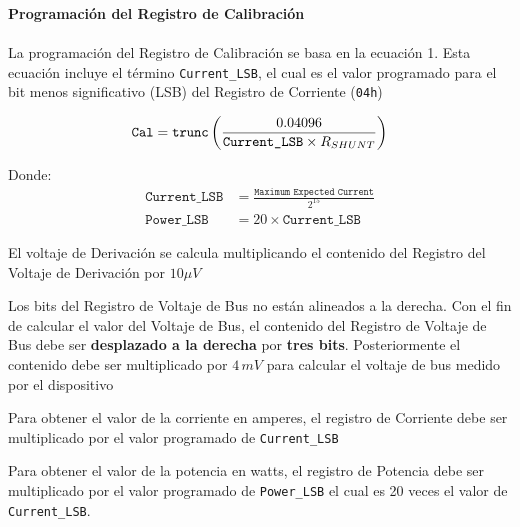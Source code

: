 \documentclass[12pt,a4paper]{article}
\begin{document}
	\noindent \textbf{Programación del Registro de Calibración}\\\\
	La programación del Registro de Calibración se basa en la ecuación 1. Esta ecuación incluye el término \texttt{Current\_LSB}, el cual es el valor programado para el bit menos significativo (LSB) del Registro de Corriente (\texttt{04h})
	
	\begin{tcolorbox}[colback=red!5!white,colframe=red!75!black,width=(\linewidth+0.45cm)]
		\begin{equation}
				\verb|Cal| = \verb|trunc|\left( \frac{0.04096}{\texttt{Current\_LSB}\times R_{SHUNT}} \right)
		\end{equation}
	\end{tcolorbox}

	Donde:
	\begin{align}
		\texttt{Current\_LSB} &= \frac{\texttt{Maximum Expected Current}}{2^{15}}\\
		\texttt{Power\_LSB} &= 20 \times \texttt{Current\_LSB}
	\end{align}

	\begin{tcolorbox}[colback=cyan!10!white,colframe=cyan!50!black,title=Voltaje de Derivación]
		El voltaje de Derivación se calcula multiplicando el contenido del Registro del Voltaje de Derivación por $10 \mu V$ 
	\end{tcolorbox}
	
	\begin{tcolorbox}[colback=cyan!10!white,colframe=cyan!50!black,title=Voltaje de Bus]
		Los bits del Registro de Voltaje de Bus no están alineados a la derecha. Con el fin de calcular el valor del Voltaje de Bus, el contenido del Registro de Voltaje de Bus debe ser \textbf{desplazado a la derecha} por \textbf{tres bits}. Posteriormente el contenido debe ser multiplicado por $4 \, mV$ para calcular el voltaje de bus medido por el dispositivo
	\end{tcolorbox}
	
	\begin{tcolorbox}[colback=cyan!10!white,colframe=cyan!50!black,title=Valor de la corriente]
		Para obtener el valor de la corriente en amperes, el registro de Corriente debe ser multiplicado por el valor programado de \texttt{Current\_LSB}
	\end{tcolorbox}

	\begin{tcolorbox}[colback=cyan!10!white,colframe=cyan!50!black,title=Valor de la potencia]
		Para obtener el valor de la potencia en watts, el registro de Potencia debe ser multiplicado por el valor programado de \texttt{Power\_LSB} el cual es 20 veces el valor de \texttt{Current\_LSB}.
	\end{tcolorbox}
\end{document}
